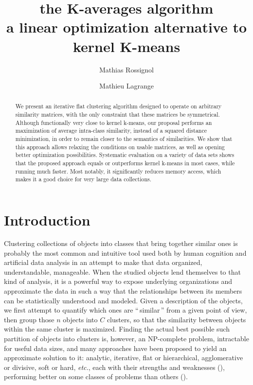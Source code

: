 \documentclass[a4paper,twoside]{article}
\begin{document}
\title{the K-averages algorithm \\ a linear optimization alternative to kernel K-means}

\author{Mathias Rossignol \and Mathieu Lagrange}

\editor{}

\maketitle


\begin{abstract}

We present an iterative flat clustering algorithm designed to operate on arbitrary similarity matrices, with the only constraint that these matrices be symmetrical. Although functionally very close to kernel k-means, our proposal performs an maximization of average intra-class similarity, instead of a squared distance minimization, in order to remain closer to the semantics of similarities. We show that this approach allows relaxing the conditions on usable matrices, as well as opening better optimization possibilities. Systematic evaluation on a variety of data sets shows that the proposed approach equals or outperforms kernel k-means in most cases, while running much faster. Most notably, it significantly reduces memory access, which makes it a good choice for very large data collections.

\end{abstract}


\section{Introduction}

Clustering collections of objects into classes that bring together similar ones is probably the most common and intuitive tool used both by human cognition and artificial data analysis in an attempt to make that data organized, understandable, manageable. When the studied objects lend themselves to that kind of analysis, it is a powerful way to expose underlying organizations and approximate the data in such a way that the relationships between its members can be statistically understood and modeled. Given a description of the objects, we first attempt to quantify which ones are ``\,similar\,'' from a given point of view, then group those $n$ objects into $C$ clusters, so that the similarity between objects within the same cluster is maximized. Finding the actual best possible such partition of objects into clusters is, however, an NP-complete problem, intractable for useful data sizes, and many approaches have been proposed to yield an approximate solution to it: analytic, iterative, flat or hierarchical, agglomerative or divisive, soft or hard, \textit{etc.}, each with their strengths and weaknesses (\cite{jain2010data}), performing better on some classes of problems than others (\cite{steinbach2000comparison,thalamuthu2006evaluation}).
\end{document}
